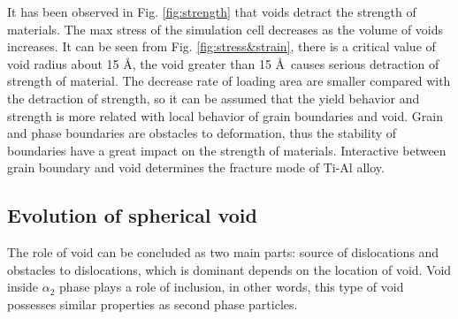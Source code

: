 \documentclass[Unknown,article,submit,moreauthors,pdftex,10pt,a4paper]{Definitions/mdpi}
\begin{document}
It has been observed in Fig. \ref{fig:strength} that voids detract the strength of  materials. The max stress  of the simulation cell decreases as the volume of voids increases. It can be seen from Fig. \ref{fig:stress&strain}, there is a critical value of void radius about 15 \AA, the void greater than 15 \AA\ causes serious detraction of strength of material.  The decrease rate of loading area are smaller compared with the detraction of strength, so it can be assumed that the  yield behavior and strength is more related with local behavior of grain boundaries and void. Grain and phase boundaries are obstacles to deformation, thus the stability of boundaries have a great impact on the strength of materials. Interactive between grain boundary and void determines the fracture mode of   Ti-Al alloy.




\subsection{Evolution of spherical void}
The role of void can be concluded as two main parts: source of dislocations and obstacles to dislocations, which is dominant depends on the location of void. Void inside $\alpha_2$ phase plays a role of inclusion, in other words, this type of void possesses similar properties as second phase particles.
 
\end{document}
